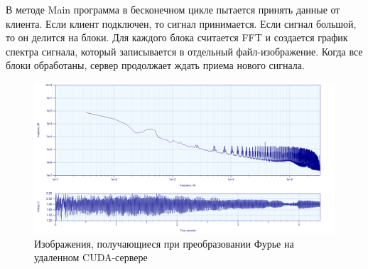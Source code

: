 \documentclass[../paper.tex]{subfiles}
\begin{document}
В методе Main программа в бесконечном цикле пытается принять данные от клиента. Если клиент подключен, то сигнал принимается. Если сигнал большой, то он делится на блоки. Для каждого блока считается FFT и создается график спектра сигнала, который записывается в отдельный файл-изображение. Когда все блоки обработаны, сервер продолжает ждать приема нового сигнала.

\begin{figure}[H]
\centering
\includegraphics[width=\textwidth]{images/fft-server}
\caption{Изображения, получающиеся при преобразовании Фурье на удаленном CUDA-сервере}
\end{figure}
\end{document}
